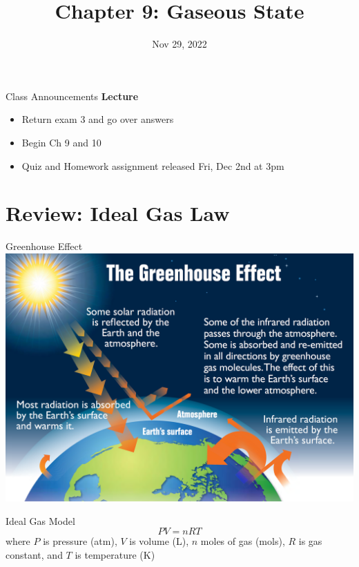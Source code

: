 \documentclass[11pt]{beamer}
\title{Chapter 9: Gaseous State}
\institute{Chemistry Department, Cypress College}
\date{Nov 29, 2022}
\begin{document}
\begin{frame}
  \titlepage
\end{frame}

\begin{frame}{Class Announcements}
  \textbf{Lecture}
  \begin{itemize}
  \item Return exam 3 and go over answers
  \item Begin Ch 9 and 10
  \item Quiz and Homework assignment released Fri, Dec
    2nd at 3pm
  \end{itemize}
\end{frame}

\section{Review: Ideal Gas Law}

\begin{frame}{Greenhouse Effect}
  \centering
  \includegraphics[width=\linewidth]{greenhouse_effect}
\end{frame}

\begin{frame}{Ideal Gas Model}
  \begin{equation}
    PV = nRT
  \end{equation}
  where $P$ is pressure (atm), $V$ is volume (L), $n$ moles of gas (mols),
  $R$ is gas constant, and $T$ is temperature (K)

\end{frame}
\end{document}
